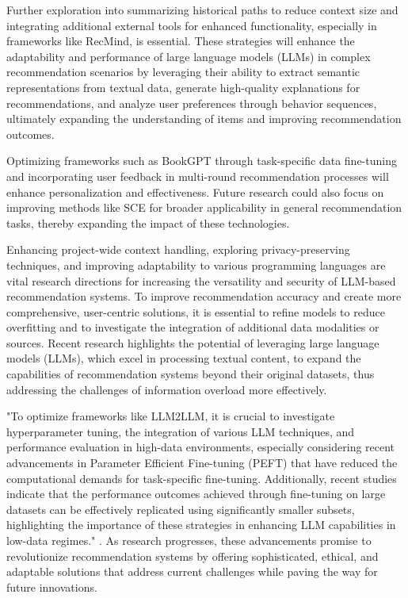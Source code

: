 Further exploration into summarizing historical paths to reduce context size and integrating additional external tools for enhanced functionality, especially in frameworks like RecMind, is essential. These strategies will enhance the adaptability and performance of large language models (LLMs) in complex recommendation scenarios by leveraging their ability to extract semantic representations from textual data, generate high-quality explanations for recommendations, and analyze user preferences through behavior sequences, ultimately expanding the understanding of items and improving recommendation outcomes. \cite{vats2024exploring,jia2024learnknowledgeadaptationlarge,ren2024representation,xu2024prompting,lin2023can}



Optimizing frameworks such as BookGPT through task-specific data fine-tuning and incorporating user feedback in multi-round recommendation processes will enhance personalization and effectiveness. Future research could also focus on improving methods like SCE for broader applicability in general recommendation tasks, thereby expanding the impact of these technologies.



Enhancing project-wide context handling, exploring privacy-preserving techniques, and improving adaptability to various programming languages are vital research directions for increasing the versatility and security of LLM-based recommendation systems. To improve recommendation accuracy and create more comprehensive, user-centric solutions, it is essential to refine models to reduce overfitting and to investigate the integration of additional data modalities or sources. Recent research highlights the potential of leveraging large language models (LLMs), which excel in processing textual content, to expand the capabilities of recommendation systems beyond their original datasets, thus addressing the challenges of information overload more effectively. \cite{vats2024exploring,ren2024representation,wei2024llmrec,bai2024finetuninglargelanguagemodel}



"To optimize frameworks like LLM2LLM, it is crucial to investigate hyperparameter tuning, the integration of various LLM techniques, and performance evaluation in high-data environments, especially considering recent advancements in Parameter Efficient Fine-tuning (PEFT) that have reduced the computational demands for task-specific fine-tuning. Additionally, recent studies indicate that the performance outcomes achieved through fine-tuning on large datasets can be effectively replicated using significantly smaller subsets, highlighting the importance of these strategies in enhancing LLM capabilities in low-data regimes." \cite{lee2024llm2llmboostingllmsnovel}. As research progresses, these advancements promise to revolutionize recommendation systems by offering sophisticated, ethical, and adaptable solutions that address current challenges while paving the way for future innovations.











